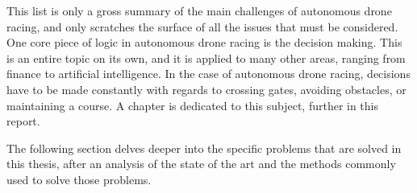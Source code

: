 This list is only a gross summary of the main challenges of autonomous drone
racing, and only scratches the surface of all the issues that must be
considered. One core piece of logic in autonomous drone racing is the decision
making. This is an entire topic on its own, and it is applied to many other
areas, ranging from finance to artificial intelligence. In the case of
autonomous drone racing, decisions have to be made constantly with regards to
crossing gates, avoiding obstacles, or maintaining a course. A chapter is
dedicated to this subject, further in this report.

The following section delves deeper into the specific problems that are solved
in this thesis, after an analysis of the state of the art and the methods
commonly used to solve those problems.

